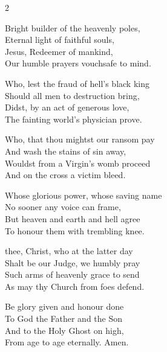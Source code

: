 \begin{multicols}{2}
\begin{enpars}

Bright builder of the heavenly poles,\\
Eternal light of faithful souls,\\
Jesus, Redeemer of mankind,\\
Our humble prayers vouchsafe to mind.

Who, lest the fraud of hell’s black king\\
Should all men to destruction bring,\\
Didst, by an act of generous love,\\
The fainting world’s physician prove.

Who, that thou mightst our ransom pay\\
And wash the stains of sin away,\\
Wouldst from a Virgin’s womb proceed\\
And on the cross a victim bleed.

Whose glorious power, whose saving name\\
No sooner any voice can frame,\\
But heaven and earth and hell agree\\
To honour them with trembling knee.

thee, Christ, who at the latter day\\
Shalt be our Judge, we humbly pray\\
Such arms of heavenly grace to send\\
As may thy Church from foes defend.

Be glory given and honour done\\
To God the Father and the Son\\
And to the Holy Ghost on high,\\
From age to age eternally. Amen.
\end{enpars}
\end{multicols}